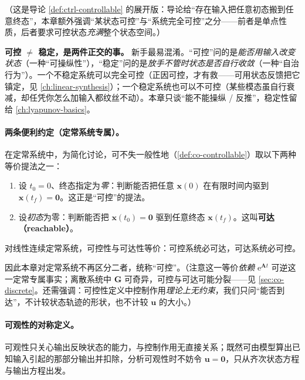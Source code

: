 \noindent{}（这是导论 \cref{def:ctrl-controllable} 的展开版：导论给“存在输入把任意初态搬到任意终态”，本章额外强调“某状态可控”与“系统完全可控”之分——前者是单点性质，后者要求可控状态\emph{充满}整个状态空间。）

\begin{insight}
\textbf{可控 $\neq$ 稳定，是两件正交的事。}\;
新手最易混淆。“可控”问的是\emph{能否用输入改变状态}（一种“可操纵性”），“稳定”问的是\emph{放手不管时状态是否自行收敛}（一种“自治行为”）。一个不稳定系统可以完全可控（正因可控，才有救——可用状态反馈把它镇定，见 \cref{ch:linear-synthesis}）；一个稳定系统也可以不可控（某些模态虽自行衰减，却任凭你怎么加输入都纹丝不动）。本章只谈“能不能操纵 / 反推”，稳定性留给 \cref{ch:lyapunov-basics}。
\end{insight}

\paragraph{两条便利约定（定常系统专属）。}
在定常系统中，为简化讨论，可不失一般性地（\cref{def:co-controllable}）取以下两种等价提法之一\cite{liubao2006modern}：

\begin{enumerate}
  \item 设 $t_0=0$、终态指定为\emph{零}：判断能否把任意 $\mathbf{x}(0)$ 在有限时间内驱到 $\mathbf{x}(t_f)=\mathbf{0}$。这正是“可控”的提法。
  \item 设\emph{初态}为零：判断能否把 $\mathbf{x}(t_0)=\mathbf{0}$ 驱到任意终态 $\mathbf{x}(t_f)$。这叫\textbf{可达（reachable）}。
\end{enumerate}

\begin{proposition}\label{prop:co-reach}
对线性连续定常系统，可控性与可达性等价：可控系统必可达，可达系统必可控\cite{liubao2006modern}。
\end{proposition}

\noindent 因此本章对定常系统不再区分二者，统称“可控”。（注意这一等价\emph{依赖} $\mathrm{e}^{\mathbf{A}t}$ 可逆这一定常专属事实；离散系统中 $\mathbf{G}$ 可奇异，可控与可达可能分裂——见 \cref{sec:co-discrete}。还需强调：可控性定义中控制作用\emph{理论上无约束}，我们只问“能否到达”，不计较状态轨迹的形状，也不计较 $\mathbf{u}$ 的大小。）

\paragraph{可观性的对称定义。}
可观性只关心输出反映状态的能力，与控制作用无直接关系；既然可由模型算出已知输入引起的那部分输出并扣除，分析可观性时不妨令 $\mathbf{u}=\mathbf{0}$，只从齐次状态方程与输出方程出发\cite{liubao2006modern}。

